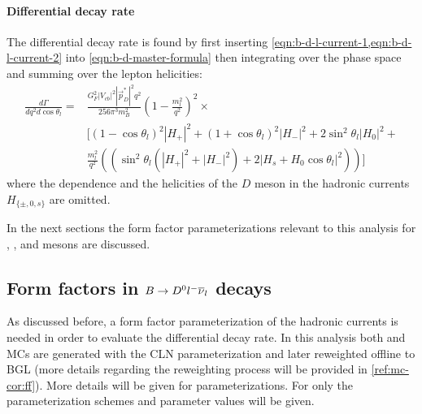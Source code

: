 \paragraph{Differential decay rate}
The differential decay rate is found by first inserting
\cref{eqn:b-d-l-current-1,eqn:b-d-l-current-2}
into \cref{eqn:b-d-master-formula} then integrating over the phase space and
summing over the lepton helicities:
\begin{align}
    \frac{d\Gamma}{d q^2 d\cos\theta_l} =&
    \frac{G^2_F |V_{cb}|^2 | \vec{p}^*_D|^2 q^2}{256 \pi^3 m^2_B}
    \left(1 - \frac{m^2_l}{q^2}\right)^2 \times
    \nonumber \\
    &\bigg[
        (1 - \cos\theta_l)^2 |H_+|^2 + (1 + \cos\theta_l)^2 |H_-|^2 +
        2 \sin^2\theta_l |H_0|^2 +
    \nonumber \\
    & \frac{m^2_l}{q^2} \left(
        (\sin^2\theta_l(|H_+|^2 + |H_-|^2) + 2|H_s + H_0 \cos\theta_l|^2)
    \right)
    \bigg]
\end{align}
where the \qSq dependence and the helicities of the $D$ meson in the hadronic
currents $H_{\{\pm,0,s\}}$ are omitted.

In the next sections the form factor parameterizations relevant to this analysis
for \Dz, \Dstar, and \Dstst mesons are discussed.


\subsection{Form factors in $B \rightarrow {\ensuremath{{D}^0}}{\ensuremath{l^-}}{\ensuremath{{\overline{\nu}}_l}}$ decays}
\label{ref:theory:ff-d0-dst}

As discussed before,
a form factor parameterization of the hadronic currents is needed in order to
evaluate the differential decay rate.
In this analysis both \Dz and \Dstar MCs are generated with the CLN
parameterization and later reweighted offline to BGL
(more details regarding the reweighting process will be provided in
\cref{ref:mc-cor:ff}).
More details will be given for \Dz parameterizations.
For \Dstar only the parameterization schemes and parameter values will be given.

